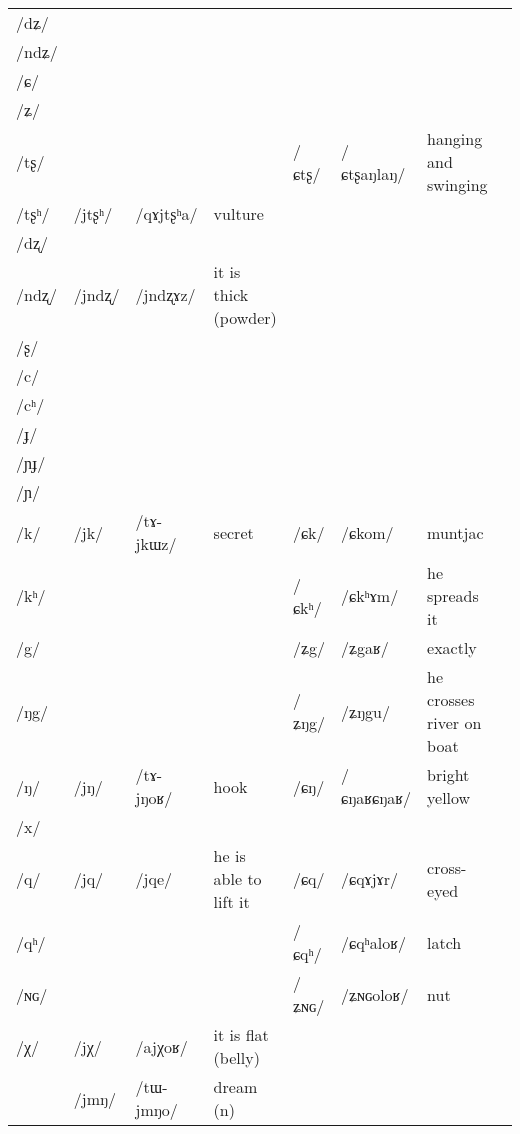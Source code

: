 \documentclass[oldfontcommands,oneside,a4paper,11pt]{article}
\newcommand{\ipa}[1]{/#1/} %
\newcommand{\idph}[1]{\cellcolor{gray}\textbf{#1}}
\begin{document}
\begin{table}
{\begin{tabular}{l|lll|lll|l}
\ipa{dʑ}  & 	  & 	  & 	  & 	  & 	  & 	  & 	\\
\ipa{ndʑ}  & 	  & 	  & 	  & 	  & 	  & 	  & 	\\
\ipa{ɕ}  & 	  & 	  & 	  & 	  & 	  & 	  & 	\\
\ipa{ʑ}  & 	  & 	  & 	  & 	  & 	  & 	  & 	\\
\ipa{tʂ}  & 	  & 	  & 	  & 	 \ipa{ɕtʂ} \idph{}  & 	 \ipa{ɕtʂaŋlaŋ}  & 	 hanging and swinging & 	\\
\ipa{tʂʰ}  & 	 \ipa{jtʂʰ}  & 	 \ipa{qɤjtʂʰa}  & 	vulture  & 	  & 	  & 	  & 	\\
\ipa{dʐ}  & 	  & 	  & 	  & 	  & 	  & 	  & 	\\
\ipa{ndʐ}  & 	 \ipa{jndʐ}  & 	 \ipa{jndʐɤz}  & 	it is thick (powder)  & 	  & 	  & 	  & 	\\
\ipa{ʂ}  & 	  & 	  & 	  & 	  & 	  & 	  & 	\\
\ipa{c}  & 	  & 	  & 	  & 	  & 	  & 	  & 	\\
\ipa{cʰ}  & 	  & 	  & 	  & 	  & 	  & 	  & 	\\
\ipa{ɟ}  & 	  & 	  & 	  & 	  & 	  & 	  & 	\\
\ipa{ɲɟ}  & 	  & 	  & 	  & 	  & 	  & 	  & 	\\
\ipa{ɲ}  & 	  & 	  & 	  & 	  & 	  & 	  & 	\\
\ipa{k}  &	 \ipa{jk}  &	 \ipa{tɤ-jkɯz}  &	 secret  &	 \ipa{ɕk}  &	 \ipa{ɕkom}  &	 muntjac  &	\\	
\ipa{kʰ}  &	  &	  &	  &	 \ipa{ɕkʰ}  &	 \ipa{ɕkʰɤm}  &	 he spreads it  &	\\	
\ipa{g}  &	  &	  &	  &	 \ipa{ʑg}  &	 \ipa{ʑgaʁ}  &	 exactly  &	\\	
\ipa{ŋg}  &	  &	  &	  &	 \ipa{ʑŋg}  &	 \ipa{ʑŋgu}  &	 he crosses river on boat  &	\\	
\ipa{ŋ}  &	 \ipa{jŋ}  &	 \ipa{tɤ-jŋoʁ}  &	 hook  &	 \ipa{ɕŋ} \idph{}  &	 \ipa{ɕŋaʁɕŋaʁ}  &	 bright yellow  &	\\	
\ipa{x}  &	  &	  &	  &	  &	  &	  &	\\	
\ipa{q}  &	 \ipa{jq}  &	 \ipa{jqe}  &	 he is able to lift it  &	 \ipa{ɕq}  &	 \ipa{ɕqɤjɤr}  &	 cross-eyed  &	\\	
\ipa{qʰ}  &	  &	  &	  &	 \ipa{ɕqʰ}  &	 \ipa{ɕqʰaloʁ}  &	 latch  &	\\	
\ipa{ɴɢ}  &	  &	  &	  &	 \ipa{ʑɴɢ}  &	 \ipa{ʑɴɢoloʁ}  &	 nut  &	\\	
\ipa{χ}  &	 \ipa{jχ}  &	 \ipa{ajχoʁ}  &	 it is flat (belly)  &	  &	  &	  &	\\	
\midrule  					 
 &\ipa{jmŋ} & \ipa{tɯ-jmŋo} &dream (n) \\  
  \end{tabular}}
\end{table}
  
\end{document}
